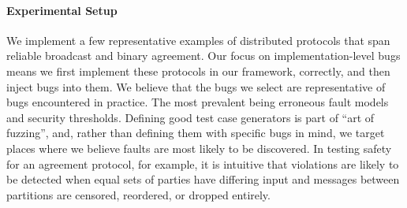 \paragraph{Experimental Setup}
We implement a few representative examples of distributed protocols that span reliable broadcast and binary agreement.
Our focus on implementation-level bugs means we first implement these protocols in our framework, correctly, and then inject bugs into them.
We believe that the bugs we select are representative of bugs encountered in practice. The most prevalent being erroneous fault models and security thresholds.
Defining good test case generators is part of ``art of fuzzing'', and, rather than defining them with specific bugs in mind, we target places where we believe faults are most likely to be discovered.
In testing safety for an agreement protocol, for example, it is intuitive that violations are likely to be detected when equal sets of parties have differing input and messages between partitions are censored, reordered, or dropped entirely.




